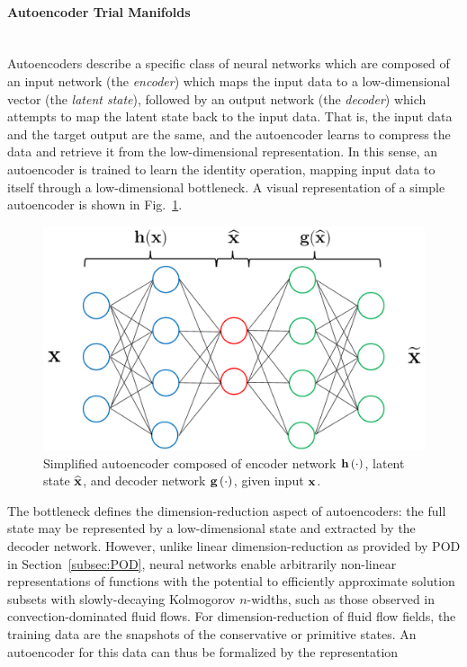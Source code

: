 \paragraph{Autoencoder Trial Manifolds}\mbox{}\\
%
Autoencoders describe a specific class of neural networks which are composed of an input network (the \textit{encoder}) which maps the input data to a low-dimensional vector (the \textit{latent state}), followed by an output network (the \textit{decoder}) which attempts to map the latent state back to the input data. That is, the input data and the target output are the same, and the autoencoder learns to compress the data and retrieve it from the low-dimensional representation. In this sense, an autoencoder is trained to learn the identity operation, mapping input data to itself through a low-dimensional bottleneck. A visual representation of a simple autoencoder is shown in Fig.~\ref{fig:aeSample}.
%
\begin{figure}
    \centering
    \includegraphics[width=0.75\linewidth]{Chapters/ProjROMs/Images/simpleAE.png}
    \caption{\label{fig:aeSample}Simplified autoencoder composed of encoder network $\mathbf{h} \left(\cdot\right)$, latent state $\mathbf{\widehat{x}}$, and decoder network $\mathbf{g} \left(\cdot\right)$, given input $\mathbf{x}$.}
\end{figure}
%
The bottleneck defines the dimension-reduction aspect of autoencoders: the full state may be represented by a low-dimensional state and extracted by the decoder network. However, unlike linear dimension-reduction as provided by POD in Section~\ref{subsec:POD}, neural networks enable arbitrarily non-linear representations of functions with the potential to efficiently approximate solution subsets with slowly-decaying Kolmogorov $n$-widths, such as those observed in convection-dominated fluid flows. For dimension-reduction of fluid flow fields, the training data are the snapshots of the conservative or primitive states. An autoencoder for this data can thus be formalized by the representation
